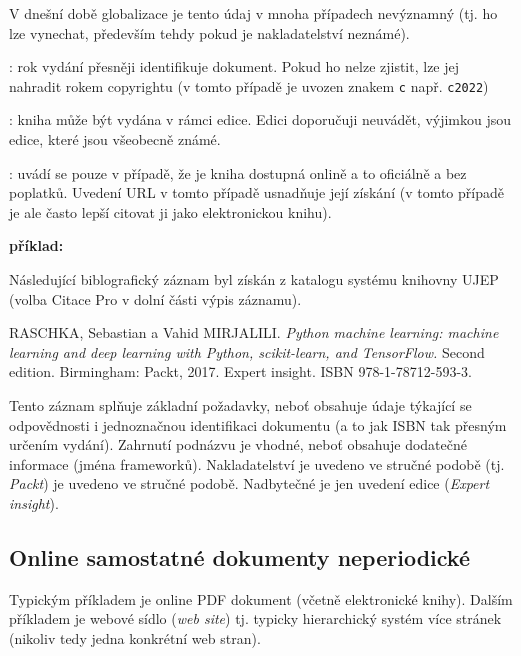 \documentclass[male,czech,api_bc]{kitheses}
\begin{document}
\begin{description}
V dnešní době globalizace je tento údaj v mnoha případech nevýznamný (tj. ho lze vynechat, především tehdy pokud je nakladatelství neznámé).
\item[rok vydání]: rok vydání přesněji identifikuje dokument. Pokud ho nelze zjistit, lze jej nahradit rokem copyrightu (v tomto případě je uvozen znakem \verb!c! např. \verb!c2022!)
\item[edice]: kniha může být vydána v rámci edice. Edici doporučuji neuvádět, výjimkou jsou edice, které jsou všeobecně známé.
\item[URL]: uvádí se pouze v případě, že je kniha dostupná onlině a to oficiálně a bez poplatků. Uvedení URL v tomto případě usnadňuje její získání (v tomto případě je ale často lepší citovat ji jako elektronickou knihu).
\end{description}

\textbf{příklad:}

Následující biblografický záznam byl získán z katalogu systému knihovny UJEP (volba Citace Pro v dolní části výpis záznamu).

RASCHKA, Sebastian a Vahid MIRJALILI. \textit{Python machine learning: machine learning and deep learning with Python, scikit-learn, and TensorFlow.} Second edition. Birmingham: Packt, 2017. Expert insight. ISBN 978-1-78712-593-3.

Tento záznam splňuje základní požadavky, neboť obsahuje údaje týkající se odpovědnosti i jednoznačnou identifikaci dokumentu (a to jak ISBN tak přesným určením vydání).  Zahrnutí podnázvu
je vhodné, neboť obsahuje dodatečné informace (jména frameworků).
Nakladatelství je uvedeno ve stručné podobě (tj. \textit{Packt}) je uvedeno ve stručné podobě. Nadbytečné je jen uvedení edice (\textit{Expert insight}).

\subsection{Online samostatné dokumenty neperiodické}

Typickým příkladem je online PDF dokument (včetně elektronické knihy). Dalším příkladem je webové sídlo (\textit{web site}) tj. typicky hierarchický systém více stránek (nikoliv tedy jedna konkrétní web stran).
\end{document}

